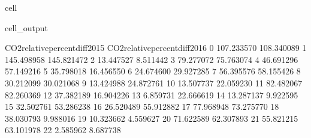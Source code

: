 \documentclass[letterpaper,10pt,english]{jupyterBook}
\begin{document}
\begin{sphinxuseclass}{cell}
\begin{sphinxVerbatimOutput}
\begin{sphinxuseclass}{cell_output}
\begin{sphinxVerbatim}[commandchars=\\\{\}]
    CO2\PYGZus{}relative\PYGZus{}percent\PYGZus{}diff\PYGZus{}2015  CO2\PYGZus{}relative\PYGZus{}percent\PYGZus{}diff\PYGZus{}2016  \PYGZbs{}
0                      \PYGZhy{}107.233570                     \PYGZhy{}108.340089   
1                      \PYGZhy{}145.498958                     \PYGZhy{}145.821472   
2                       \PYGZhy{}13.447527                       \PYGZhy{}8.511442   
3                        79.277072                       75.763074   
4                        46.691296                       57.149216   
5                       \PYGZhy{}35.798018                      \PYGZhy{}16.456550   
6                        24.674600                       29.927285   
7                        56.395576                       58.155426   
8                        30.212099                       30.021068   
9                       \PYGZhy{}13.424988                      \PYGZhy{}24.872761   
10                       13.507737                       22.059230   
11                       82.482067                       82.260369   
12                       37.382189                       16.904226   
13                       \PYGZhy{}6.859731                      \PYGZhy{}22.666619   
14                       13.287137                        9.922595   
15                       32.502761                       53.286238   
16                      \PYGZhy{}26.520489                      \PYGZhy{}55.912882   
17                       77.968948                       73.275770   
18                      \PYGZhy{}38.030793                       \PYGZhy{}9.988016   
19                       10.323662                       \PYGZhy{}4.559627   
20                      \PYGZhy{}71.622589                      \PYGZhy{}62.307893   
21                       55.821215                       63.101978   
22                        2.585962                       \PYGZhy{}8.687738   


\end{sphinxVerbatim}
\end{sphinxuseclass}
\end{sphinxVerbatimOutput}
\end{sphinxuseclass}
\end{document}

